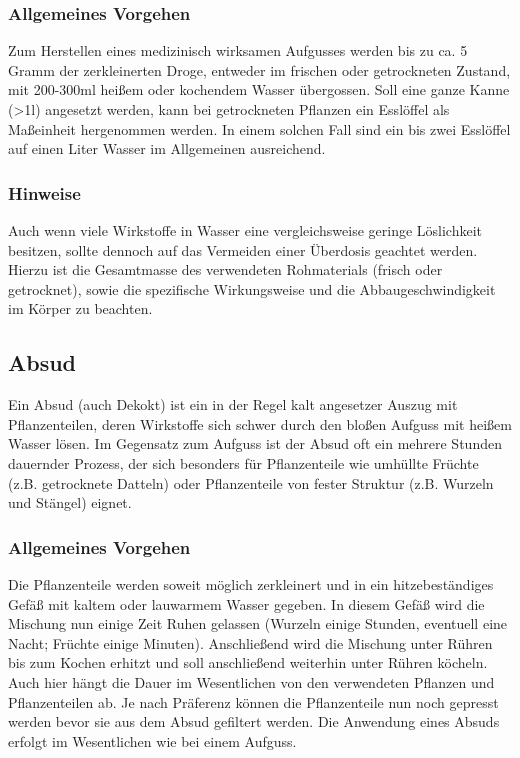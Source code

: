 \subsubsection{Allgemeines Vorgehen}
Zum Herstellen eines medizinisch wirksamen Aufgusses werden bis zu ca. 5 Gramm der zerkleinerten Droge, entweder im frischen oder getrockneten Zustand, mit 200-300ml heißem oder kochendem Wasser übergossen. Soll eine ganze Kanne (>1l) angesetzt werden, kann bei getrockneten Pflanzen ein Esslöffel als Maßeinheit hergenommen werden. In einem solchen Fall sind ein bis zwei Esslöffel auf einen Liter Wasser im Allgemeinen ausreichend.
\subsubsection{Hinweise}
Auch wenn viele Wirkstoffe in Wasser eine vergleichsweise geringe Löslichkeit besitzen, sollte dennoch auf das Vermeiden einer Überdosis geachtet werden. Hierzu ist die Gesamtmasse des verwendeten Rohmaterials (frisch oder getrocknet), sowie die spezifische Wirkungsweise und die Abbaugeschwindigkeit im Körper zu beachten.

\subsection{Absud}
Ein Absud (auch Dekokt) ist ein in der Regel kalt angesetzer Auszug mit Pflanzenteilen, deren Wirkstoffe sich schwer durch den bloßen Aufguss mit heißem Wasser lösen. Im Gegensatz zum Aufguss ist der Absud oft ein mehrere Stunden dauernder Prozess, der sich besonders für Pflanzenteile wie umhüllte Früchte (z.B. getrocknete Datteln) oder Pflanzenteile von fester Struktur (z.B. Wurzeln und Stängel) eignet.
\subsubsection{Allgemeines Vorgehen}
Die Pflanzenteile werden soweit möglich zerkleinert und in ein hitzebeständiges Gefäß mit kaltem oder lauwarmem Wasser gegeben. In diesem Gefäß wird die Mischung nun einige Zeit Ruhen gelassen (Wurzeln einige Stunden, eventuell eine Nacht; Früchte einige Minuten). Anschließend wird die Mischung unter Rühren bis zum Kochen erhitzt und soll anschließend weiterhin unter Rühren köcheln. Auch hier hängt die Dauer im Wesentlichen von den verwendeten Pflanzen und Pflanzenteilen ab. Je nach Präferenz können die Pflanzenteile nun noch gepresst werden bevor sie aus dem Absud gefiltert werden.
Die Anwendung eines Absuds erfolgt im Wesentlichen wie bei einem Aufguss.
